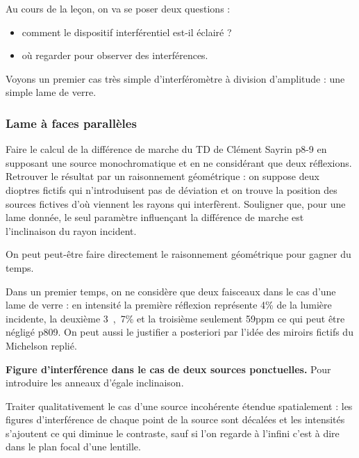 Au cours de la leçon, on va se poser deux questions :
\begin{itemize}
\item comment le dispositif interférentiel est-il éclairé ?
\item où regarder pour observer des interférences.
\end{itemize}

\begin{transition}
Voyons un premier cas très simple d'interféromètre à division d'amplitude : une simple lame de verre.
\end{transition}

\subsubsection{Lame à faces parallèles}

Faire le calcul de la différence de marche du TD de Clément Sayrin p8-9 en supposant une source monochromatique et en ne considérant que deux réflexions. 
Retrouver le résultat par un raisonnement géométrique : on suppose deux dioptres fictifs qui n'introduisent pas de déviation et on trouve la position des sources fictives d'où viennent les rayons qui interfèrent.
Souligner que, pour une lame donnée, le seul paramètre influençant la différence de marche est l'inclinaison du rayon incident.
\begin{remarque}
On peut peut-être faire directement le raisonnement géométrique pour gagner du temps. 

\noindent
Dans un premier temps, on ne considère que deux faisceaux dans le cas d'une lame de verre : en intensité la première réflexion représente \unit{4}{\%} de la lumière incidente, la deuxième \unit{3{,}7}{\%} et la troisième seulement \unit{59}{ppm} ce qui peut être négligé \cite{Olivier2000} p809.
On peut aussi le justifier a posteriori par l'idée des miroirs fictifs du Michelson replié.
\end{remarque}

\begin{slide}
\textbf{Figure d'interférence dans le cas de deux sources ponctuelles.}
Pour introduire les anneaux d'égale inclinaison.
\end{slide}

Traiter qualitativement le cas d'une source incohérente étendue spatialement : les figures d'interférence de chaque point de la source sont décalées et les intensités s'ajoutent ce qui diminue le contraste, sauf si l'on regarde à l'infini c'est à dire dans le plan focal d'une lentille.

